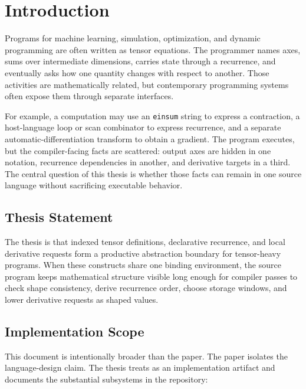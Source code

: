 \chapter{Introduction}

Programs for machine learning, simulation, optimization, and dynamic programming
are often written as tensor equations. The programmer names axes, sums over
intermediate dimensions, carries state through a recurrence, and eventually asks
how one quantity changes with respect to another. Those activities are
mathematically related, but contemporary programming systems often expose them
through separate interfaces.

For example, a computation may use an \texttt{einsum} string to express a
contraction, a host-language loop or scan combinator to express recurrence, and
a separate automatic-differentiation transform to obtain a gradient. The program
executes, but the compiler-facing facts are scattered: output axes are hidden in
one notation, recurrence dependencies in another, and derivative targets in a
third. The central question of this thesis is whether those facts can remain in
one source language without sacrificing executable behavior.

\section{Thesis Statement}

The thesis is that indexed tensor definitions, declarative recurrence, and local
derivative requests form a productive abstraction boundary for tensor-heavy
programs. When these constructs share one binding environment, the source
program keeps mathematical structure visible long enough for compiler passes to
check shape consistency, derive recurrence order, choose storage windows, and
lower derivative requests as shaped values.

\section{Implementation Scope}

This document is intentionally broader than the paper. The paper isolates the
language-design claim. The thesis treats \einlang{} as an implementation
artifact and documents the substantial subsystems in the repository:

